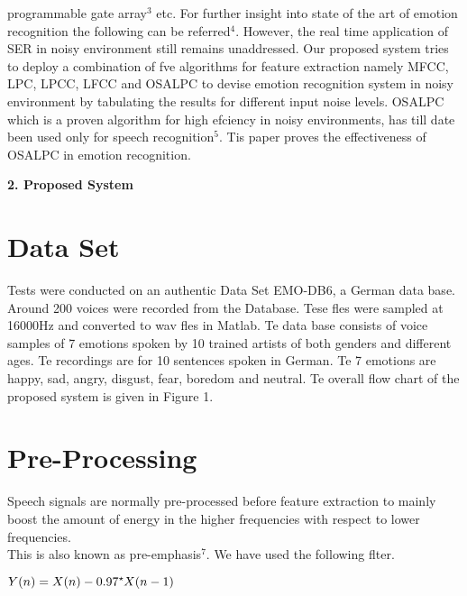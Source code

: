 \documentclass[10pt,a4paper,twoside]{article}
\begin{document}
\begin{multicols*}{2}
programmable gate array$^3$ etc. For further insight into
state of the art of emotion recognition the following
can be referred$^4$. However, the real time application of
SER in noisy environment still remains unaddressed.
Our proposed system tries to deploy a combination of
fve algorithms for feature extraction namely MFCC,
LPC, LPCC, LFCC and OSALPC to devise emotion
recognition system in noisy environment by tabulating the results for different input noise levels. OSALPC
which is a proven algorithm for high efciency in noisy
environments, has till date been used only for speech
recognition$^5$. Tis paper proves the effectiveness of
OSALPC in emotion recognition.
\smallskip

{\Large  \color{tieude} \rmfamily \textbf{2. Proposed System }}

\section*{\color{tieude} {\fontsize{11pt}{13pt} Data Set}}

Tests were conducted on an authentic Data Set
EMO-DB6, a German data base. Around 200 voices were
recorded from the Database. Tese fles were sampled
at 16000Hz and converted to wav fles in Matlab. Te
data base consists of voice samples of 7 emotions spoken
by 10 trained artists of both genders and different ages. Te recordings are for 10 sentences spoken in German.
Te 7 emotions are happy, sad, angry, disgust, fear, boredom and neutral. Te overall flow chart of the proposed
system is given in Figure 1.
\smallskip
\section*{\color{tieude} {\fontsize{11pt}{13pt} Pre-Processing}}

Speech signals are normally pre-processed before feature extraction to mainly boost the amount of energy
in the higher frequencies with respect to lower frequencies.\\
This is also known as pre-emphasis$^7$. We have used the
following flter.
\begin{center}
$
Y(n)=X(n)-0.97\text{\raisebox{0.9ex}{\mbox{\scriptsize$\star$}}}X(n-1)
$
\end{center}

\end{multicols*}
\end{document}
